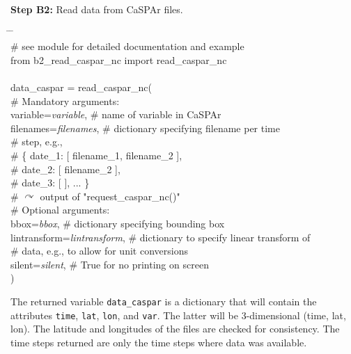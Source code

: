 \documentclass[10pt,a4paper,titlepage,parskip]{scrartcl}
\newenvironment{ttfont}{\fontfamily{\ttdefault}\selectfont}{\par}
\newcommand{\GRAU}[1]{\textcolor{ufzgray2}{#1}}
\begin{document}
\textbf{Step B2:} Read data from CaSPAr files.
\begin{framed}
	\vspace*{-1.2cm}
	\begin{ttfont}
		\begin{tabbing}
			\hspace{1.0cm} \= \hspace{5.2cm} \= \kill \\[4pt]
			\GRAU{\# see module for detailed documentation and example}\\
			from b2\_read\_caspar\_nc import read\_caspar\_nc\\
			\\
			data\_caspar = read\_caspar\_nc(\\
			\> \GRAU{\# Mandatory arguments:}\\
			\> variable=\textit{variable}, \> \GRAU{\# name of variable in CaSPAr}\\
			\> filenames=\textit{filenames}, \> \GRAU{\# dictionary specifying filename per time}\\
			\>  \> \GRAU{\# step, e.g.,}\\
			\>  \> \GRAU{\#  \{ date\_1: [ filename\_1, filename\_2 ],}\\
			\>  \> \GRAU{\# \hspace*{0.2cm}    date\_2: [ filename\_2 ],}\\
			\>  \> \GRAU{\# \hspace*{0.2cm}    date\_3: [ ], ... \}}\\
			\>  \> \GRAU{\# $\curvearrowright$ output of "request\_caspar\_nc()"}\\
			\> \GRAU{\# Optional arguments:}\\
			\> bbox=\textit{bbox}, \> \GRAU{\# dictionary specifying bounding box}\\
			\> lintransform=\textit{lintransform}, \> \GRAU{\# dictionary to specify linear transform of}\\
			\>  \> \GRAU{\# data, e.g., to allow for unit conversions}\\
			\> silent=\textit{silent}, \> \GRAU{\# True for no printing on screen}\\
			\> ) \> 
		\end{tabbing}
	\end{ttfont}
	\vspace*{-0.3cm}
\end{framed}
\vspace*{-0.3cm}
The returned variable \texttt{data\_caspar} is a dictionary that will contain the attributes \texttt{time}, \texttt{lat}, \texttt{lon}, and \texttt{var}. The latter will be 3-dimensional (time, lat, lon). The latitude and longitudes of the files are checked for consistency. The time steps returned are only the time steps where data was available.
\end{document}
